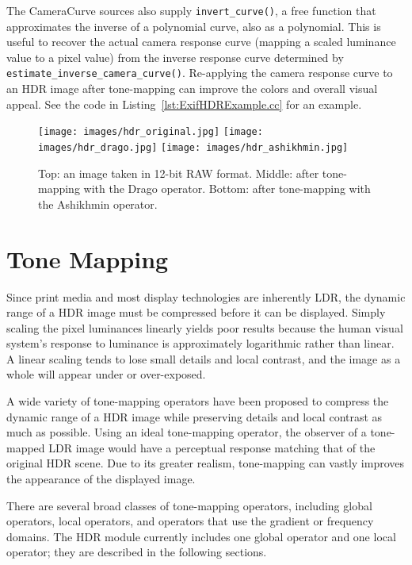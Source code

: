 The CameraCurve sources also supply \verb#invert_curve()#, a free
function that approximates the inverse of a polynomial curve, also as
a polynomial. This is useful to recover the actual camera response
curve (mapping a scaled luminance value to a pixel value) from the
inverse response curve determined by
\verb#estimate_inverse_camera_curve()#. Re-applying the camera
response curve to an HDR image after tone-mapping can improve the
colors and overall visual appeal. See the code in
Listing~\ref{lst:ExifHDRExample.cc} for an example.

\begin{figure}[tbp]
\begin{center}
  \texttt{[image: images/hdr\_original.jpg]}
  \texttt{[image: images/hdr\_drago.jpg]}
  \texttt{[image: images/hdr\_ashikhmin.jpg]}
 \end{center}
  \label{fig:tonemapping}
  \caption{Top: an image taken in 12-bit RAW format. Middle: after
           tone-mapping with the Drago operator. Bottom: after
           tone-mapping with the Ashikhmin operator.}
\end{figure}

\section{Tone Mapping}
\label{sec:tonemapping}
Since print media and most display technologies are inherently LDR,
the dynamic range of a HDR image must be compressed before it
can be displayed. Simply scaling the pixel luminances linearly
yields poor results because the human visual system's response to
luminance is approximately logarithmic rather than linear. A linear
scaling tends to lose small details and local contrast, and the
image as a whole will appear under or over-exposed.

A wide variety of tone-mapping operators have been proposed to
compress the dynamic range of a HDR image while preserving
details and local contrast as much as possible. Using an ideal
tone-mapping operator, the observer of a tone-mapped LDR image
would have a perceptual response matching that of the original
HDR scene. Due to its greater realism, tone-mapping can
vastly improves the appearance of the displayed image.

There are several broad classes of tone-mapping operators, including
global operators, local operators, and operators that use the
gradient or frequency domains. The HDR module currently includes
one global operator and one local operator; they are described in
the following sections.

